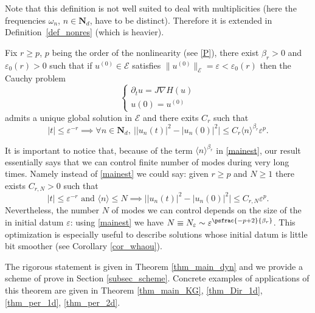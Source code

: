 Note that this definition is not well suited to deal with multiplicities (here the frequencies $\omega_n$, $n\in \mathbf{N}_d$, have to be distinct). Therefore it is extended in Definition~\ref{def_nonres} (which is heavier).

\begin{theorem}[Heuristic]\label{sketch}
Fix $r\geq p$, $p$ being the order of the nonlinearity (see \eqref{P}), there exist $\beta_r>0$ and $\varepsilon_0(r)>0$ such that if $u^{(0)} \in{\mathcal{E}}$ satisfies $\| u^{(0)} \|_{{\mathcal{E}}}=\varepsilon<\varepsilon_0(r)$ then the Cauchy problem
\[
\begin{cases}\partial_t u=J\nabla H(u)\\u(0)=u^{(0)} \end{cases}
\]
admits a unique global solution in $\mathcal E$ and there exits $C_r$ such that
\begin{equation}\label{mainest}
|t|\leq \varepsilon^{-r} \implies \forall n\in \mathbf{N}_d,\ \bigl ||u_n(t)|^2-|u_n(0)|^2\bigr|\leq C_r\langle n\rangle^{\beta_r}\varepsilon^p.
\end{equation}
\end{theorem}
It is important to notice that, because of the term $\langle n\rangle^{\beta_r}$ in \eqref{mainest}, our result essentially says that we can control finite number of modes during very long times. Namely instead of \eqref{mainest} we could say: given $r\geq p$ and $N\geq 1$ there exists $C_{r,N}>0$ such that
\[
|t|\leq \varepsilon^{-r} \text{ and } \langle n\rangle\leq N \implies \bigl ||u_n(t)|^2-|u_n(0)|^2\bigr|\leq C_{r,N}\varepsilon^p.
\]
Nevertheless, the number $N$ of modes we can control depends on the size of the in initial datum $\varepsilon$: using \eqref{mainest} we have $N\equiv N_\varepsilon\sim \varepsilon^{\psfrac{-p+2}{\beta_r}}$. This optimization is especially useful to describe solutions whose initial datum is little bit smoother (see \eg Corollary \ref{cor_whaou}).

The rigorous statement is given in Theorem \ref{thm_main_dyn} and we provide a scheme of prove in Section \ref{subsec_scheme}. Concrete examples of applications of this theorem are given in Theorem \ref{thm_main_KG}, \ref{thm_Dir_1d}, \ref{thm_per_1d}, \ref{thm_per_2d}.


